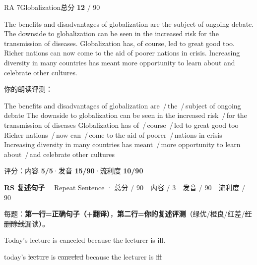 \documentclass[11pt]{article}
\newcommand{\sfull}[1]{\textcolor{cFix}{\bfseries #1}}     %
\newcommand{\spart}[1]{\textcolor{cPartial}{\bfseries #1}} %
\newcommand{\szero}[1]{\textcolor{cWrong}{\bfseries #1}}   %
\newcommand{\ptetask}[2]{%
  \needspace{4\baselineskip}\medskip
  \begin{tcolorbox}[enhanced, colback=cHead, colframe=cHead, sharp corners,
     left=12pt, right=12pt, top=5pt, bottom=5pt, boxrule=0pt]
    {\large\bfseries\color{white} #1}\ \ {\color{white!80} #2}
  \end{tcolorbox}\smallskip}
\newcommand{\sg}[1]{\textcolor{cSpkGood}{#1}}   %
\newcommand{\sy}[1]{\textcolor{cSpkOk}{#1}}     %
\newcommand{\smiss}[1]{\textcolor{cSpkBad}{\sout{#1}}}  %
\newcommand{\pse}{{\color{gray}\,/\,}}          %
\begin{document}
\begin{qblock}{RA 7\quad Globalization}{总分 \textcolor{cAccent}{\bfseries 12} / 90}
\begin{promptbox}
The benefits and disadvantages of globalization are the subject of ongoing debate. The downside to globalization can be seen in the increased risk for the transmission of diseases. Globalization has, of course, led to great good too. Richer nations can now come to the aid of poorer nations in crisis. Increasing diversity in many countries has meant more opportunity to learn about and celebrate other cultures.
\end{promptbox}
\smallskip\par{\footnotesize\color{gray}你的朗读评测：}
\begin{asrbox}
\sg{The benefits and} \sy{disadvantages of} \sg{globalization are} \pse \sy{the} \pse \sy{subject of ongoing debate} \sg{The downside to} \sg{globalization can be seen in the increased risk} \pse \sg{for the transmission of diseases Globalization has of} \pse \sy{course} \pse \sy{led to great good too Richer nations} \pse \sy{now can} \pse \sy{come to the aid of poorer} \pse \sg{nations in} \sy{crisis} \sg{Increasing diversity in many countries has meant} \pse \sy{more opportunity to learn about} \pse \sg{and celebrate other cultures}
\end{asrbox}
{\small 评分：内容 \sfull{5/5}\quad·\quad 发音 \spart{15/90}\quad·\quad 流利度 \szero{10/90}}
\end{qblock}

\ptetask{RS 复述句子}{Repeat Sentence · 总分 / 90　内容 / 3　发音 / 90　流利度 / 90}

{\small\color{gray} 每题：\textbf{第一行=正确句子（+翻译）}，\textbf{第二行=你的复述评测}（{\color{cSpkGood}绿优}/{\color{cSpkOk}橙良}/{\color{cSpkBad}红差}/{\color{cSpkBad}\sout{红删除线}漏读}）。}\smallskip

\newcommand{\rsitem}[5]{%
  \par\smallskip{\small\textbf{\##1}\quad 总分 \textcolor{cAccent}{\bfseries #2}/90 \quad
   {\footnotesize\color{gray}内容 #3/3 · 发音 #4 · 流利度 #5}}\par\nopagebreak\smallskip}

\rsitem{1428}{48}{2.2}{59}{59}
{\small Today's lecture is canceled because the lecturer is ill.}\par {}\par\smallskip
\begin{asrbox}\sg{today's} \smiss{lecture} \sg{is} \smiss{canceled} \sg{because the lecturer is} \smiss{ill}\end{asrbox}
\end{document}
